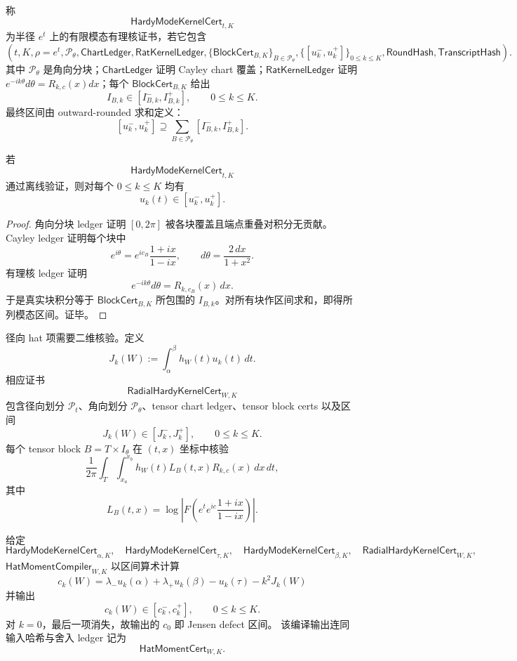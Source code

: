 \begin{definition}\label{def:typed-address-biaxial-completion-hardy-mode-kernel-cert}
称
\[
\mathsf{HardyModeKernelCert}_{t,K}
\]
为半径 \(e^t\) 上的有限模态有理核证书，若它包含
\[
\left(
t,K,\rho=e^t,
\mathcal P_\theta,
\mathsf{ChartLedger},
\mathsf{RatKernelLedger},
\{\mathsf{BlockCert}_{B,K}\}_{B\in\mathcal P_\theta},
\{[u_k^-,u_k^+]\}_{0\le k\le K},
\mathsf{RoundHash},
\mathsf{TranscriptHash}
\right).
\]
其中 \(\mathcal P_\theta\) 是角向分块；\(\mathsf{ChartLedger}\) 证明 Cayley chart 覆盖；\(\mathsf{RatKernelLedger}\) 证明 \(e^{-ik\theta}d\theta=R_{k,c}(x)dx\)；每个 \(\mathsf{BlockCert}_{B,K}\) 给出
\[
I_{B,k}\in[I_{B,k}^-,I_{B,k}^+],
\qquad 0\le k\le K.
\]
最终区间由 outward-rounded 求和定义：
\[
[u_k^-,u_k^+]
\supseteq
\sum_{B\in\mathcal P_\theta}[I_{B,k}^-,I_{B,k}^+].
\]
\end{definition}

\begin{theorem}[模态有理核证书的可靠性]\label{thm:typed-address-biaxial-completion-mode-kernel-soundness}
若
\[
\mathsf{HardyModeKernelCert}_{t,K}
\]
通过离线验证，则对每个 \(0\le k\le K\) 均有
\[
u_k(t)\in[u_k^-,u_k^+].
\]
\end{theorem}
\begin{proof}
角向分块 ledger 证明 \([0,2\pi]\) 被各块覆盖且端点重叠对积分无贡献。Cayley ledger 证明每个块中
\[
e^{i\theta}=e^{ic_B}\frac{1+ix}{1-ix},
\qquad
d\theta=\frac{2\,dx}{1+x^2}.
\]
有理核 ledger 证明
\[
e^{-ik\theta}d\theta=R_{k,c_B}(x)\,dx.
\]
于是真实块积分等于 \(\mathsf{BlockCert}_{B,K}\) 所包围的 \(I_{B,k}\)。对所有块作区间求和，即得所列模态区间。证毕。
\end{proof}

径向 hat 项需要二维核验。定义
\[
J_k(W):=\int_\alpha^\beta h_W(t)u_k(t)\,dt .
\]
相应证书
\[
\mathsf{RadialHardyKernelCert}_{W,K}
\]
包含径向划分 \(\mathcal P_t\)、角向划分 \(\mathcal P_\theta\)、tensor chart ledger、tensor block certs 以及区间
\[
J_k(W)\in[J_k^-,J_k^+],
\qquad 0\le k\le K.
\]
每个 tensor block \(B=T\times I_\theta\) 在 \((t,x)\) 坐标中核验
\[
\frac1{2\pi}
\int_T\int_{x_a}^{x_b}
h_W(t)L_B(t,x)R_{k,c}(x)\,dx\,dt,
\]
其中
\[
L_B(t,x)=
\log\left|
F\left(
e^t e^{ic}\frac{1+ix}{1-ix}
\right)
\right|.
\]

\begin{definition}\label{def:typed-address-biaxial-completion-hat-moment-compiler}
给定
\[
\mathsf{HardyModeKernelCert}_{\alpha,K},\quad
\mathsf{HardyModeKernelCert}_{\tau,K},\quad
\mathsf{HardyModeKernelCert}_{\beta,K},
\quad
\mathsf{RadialHardyKernelCert}_{W,K},
\]
\(\mathsf{HatMomentCompiler}_{W,K}\) 以区间算术计算
\[
c_k(W)
=
\lambda_-u_k(\alpha)
+\lambda_+u_k(\beta)
-u_k(\tau)
-k^2J_k(W)
\]
并输出
\[
c_k(W)\in[c_k^-,c_k^+],
\qquad 0\le k\le K.
\]
对 \(k=0\)，最后一项消失，故输出的 \(c_0\) 即 Jensen defect 区间。
该编译输出连同输入哈希与舍入 ledger 记为
\[
\mathsf{HatMomentCert}_{W,K}.
\]
\end{definition}

